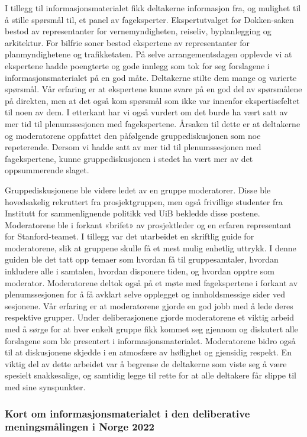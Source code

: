 \documentclass[
  12pt,
  a4paper, 12pt]{article}
\begin{document}
I tillegg til informasjonsmaterialet fikk deltakerne informasjon fra, og mulighet til å stille spørsmål til, et panel av fageksperter. Ekspertutvalget for Dokken-saken bestod av representanter for vernemyndigheten, reiseliv, byplanlegging og arkitektur. For bilfrie soner bestod ekspertene av representanter for planmyndighetene og trafikketaten. På selve arrangementsdagen opplevde vi at ekspertene hadde poengterte og gode innlegg som tok for seg forslagene i informasjonsmaterialet på en god måte. Deltakerne stilte dem mange og varierte spørsmål. Vår erfaring er at ekspertene kunne svare på en god del av spørsmålene på direkten, men at det også kom spørsmål som ikke var innenfor ekspertisefeltet til noen av dem. I etterkant har vi også vurdert om det burde ha vært satt av mer tid til plenumssesjonen med fagekspertene. Årsaken til dette er at deltakerne og moderatorene oppfattet den påfølgende gruppediskusjonen som noe repeterende. Dersom vi hadde satt av mer tid til plenumssesjonen med fagekspertene, kunne gruppediskusjonen i stedet ha vært mer av det oppsummerende slaget.

Gruppediskusjonene ble videre ledet av en gruppe moderatorer. Disse ble hovedsakelig rekruttert fra prosjektgruppen, men også frivillige studenter fra Institutt for sammenlignende politikk ved UiB bekledde disse postene. Moderatorene ble i forkant «brifet» av prosjektleder og en erfaren representant for Stanford-teamet. I tillegg var det utarbeidet en skriftlig guide for moderatorene, slik at gruppene skulle få et mest mulig enhetlig uttrykk. I denne guiden ble det tatt opp temaer som hvordan få til gruppesamtaler, hvordan inkludere alle i samtalen, hvordan disponere tiden, og hvordan opptre som moderator. Moderatorene deltok også på et møte med fagekspertene i forkant av plenumssesjonen for å få avklart selve opplegget og innholdsmessige sider ved sesjonene. Vår erfaring er at moderatorene gjorde en god jobb med å lede deres respektive grupper. Under deliberasjonene gjorde moderatorene et viktig arbeid med å sørge for at hver enkelt gruppe fikk kommet seg gjennom og diskutert alle forslagene som ble presentert i informasjonsmaterialet. Moderatorene bidro også til at diskusjonene skjedde i en atmosfære av høflighet og gjensidig respekt. En viktig del av dette arbeidet var å begrense de deltakerne som viste seg å være spesielt snakkesalige, og samtidig legge til rette for at alle deltakere får slippe til med sine synspunkter.

\hypertarget{kort-om-informasjonsmaterialet-i-den-deliberative-meningsmuxe5lingen-i-norge-2022}{%
\subsubsection{Kort om informasjonsmaterialet i den deliberative meningsmålingen i Norge 2022}\label{kort-om-informasjonsmaterialet-i-den-deliberative-meningsmuxe5lingen-i-norge-2022}}
\end{document}
